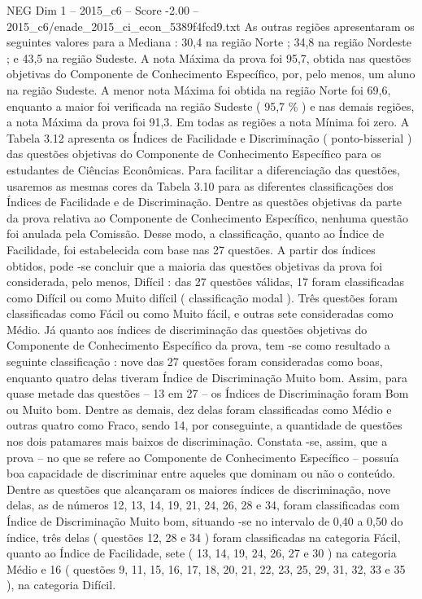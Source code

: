 \begin{textsample}{NEG Dim 1 – 2015\_c6 – Score -2.00 – 2015\_c6/enade\_2015\_ci\_econ\_5389f4fcd9.txt}
As outras regiões apresentaram os seguintes valores para a Mediana : 30,4 na região Norte ; 34,8 na região Nordeste ; e 43,5 na região Sudeste.
A nota Máxima da prova foi 95,7, obtida nas questões objetivas do Componente de Conhecimento Específico, por, pelo menos, um aluno na região Sudeste.
A menor nota Máxima foi obtida na região Norte foi 69,6, enquanto a maior foi verificada na região Sudeste ( 95,7 \% ) e nas demais regiões, a nota Máxima da prova foi 91,3.
Em todas as regiões a nota Mínima foi zero.
A Tabela 3.12 apresenta os Índices de Facilidade e Discriminação ( ponto-bisserial ) das questões objetivas do Componente de Conhecimento Específico para os estudantes de Ciências Econômicas.
Para facilitar a diferenciação das questões, usaremos as mesmas cores da Tabela 3.10 para as diferentes classificações dos Índices de Facilidade e de Discriminação.
Dentre as questões objetivas da parte da prova relativa ao Componente de Conhecimento Específico, nenhuma questão foi anulada pela Comissão.
Desse modo, a classificação, quanto ao Índice de Facilidade, foi estabelecida com base nas 27 questões.
A partir dos índices obtidos, pode -se concluir que a maioria das questões objetivas da prova foi considerada, pelo menos, Difícil : das 27 questões válidas, 17 foram classificadas como Difícil ou como Muito difícil ( classificação modal ).
Três questões foram classificadas como Fácil ou como Muito fácil, e outras sete consideradas como Médio.
Já quanto aos índices de discriminação das questões objetivas do Componente de Conhecimento Específico da prova, tem -se como resultado a seguinte classificação : nove das 27 questões foram consideradas como boas, enquanto quatro delas tiveram Índice de Discriminação Muito bom.
Assim, para quase metade das questões – 13 em 27 – os Índices de Discriminação foram Bom ou Muito bom.
Dentre as demais, dez delas foram classificadas como Médio e outras quatro como Fraco, sendo 14, por conseguinte, a quantidade de questões nos dois patamares mais baixos de discriminação.
Constata -se, assim, que a prova – no que se refere ao Componente de Conhecimento Específico – possuía boa capacidade de discriminar entre aqueles que dominam ou não o conteúdo.
Dentre as questões que alcançaram os maiores índices de discriminação, nove delas, as de números 12, 13, 14, 19, 21, 24, 26, 28 e 34, foram classificadas com Índice de Discriminação Muito bom, situando -se no intervalo de 0,40 a 0,50 do índice, três delas ( questões 12, 28 e 34 ) foram classificadas na categoria Fácil, quanto ao Índice de Facilidade, sete ( 13, 14, 19, 24, 26, 27 e 30 ) na categoria Médio e 16 ( questões 9, 11, 15, 16, 17, 18, 20, 21, 22, 23, 25, 29, 31, 32, 33 e 35 ), na categoria Difícil.

\end{textsample}
